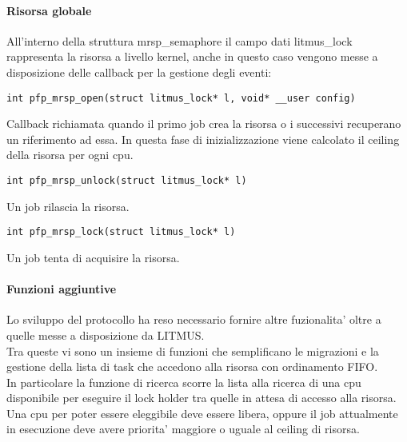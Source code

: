 \documentclass[a4paper,11pt]{article}
\begin{document}
\paragraph{Risorsa globale}

\noindent All'interno della struttura mrsp\_semaphore il campo dati litmus\_lock rappresenta la risorsa a livello kernel, anche in questo caso vengono messe a disposizione delle callback per la gestione degli eventi:

\hspace{0.2mm}
\begin{lstlisting}
int pfp_mrsp_open(struct litmus_lock* l, void* __user config)
\end{lstlisting}

\noindent Callback richiamata quando il primo job crea la risorsa o i successivi recuperano un riferimento ad essa. In questa fase di inizializzazione viene calcolato il ceiling della risorsa per ogni cpu.

\hspace{0.2mm}
\begin{lstlisting}
int pfp_mrsp_unlock(struct litmus_lock* l)
\end{lstlisting}

\noindent Un job rilascia la risorsa.

\hspace{0.2mm}
\begin{lstlisting}
int pfp_mrsp_lock(struct litmus_lock* l)
\end{lstlisting}

\noindent Un job tenta di acquisire la risorsa.

\hspace{0.2mm}
\paragraph{Funzioni aggiuntive}

\noindent Lo sviluppo del protocollo ha reso necessario fornire altre fuzionalita' oltre a quelle messe a disposizione da LITMUS.\\

\noindent Tra queste vi sono un insieme di funzioni che semplificano le migrazioni e la gestione della lista di task che accedono alla risorsa con ordinamento FIFO.\\

\noindent In particolare la funzione di ricerca scorre la lista alla ricerca di una cpu disponibile per eseguire il lock holder tra quelle in attesa di accesso alla risorsa. Una cpu per poter essere eleggibile deve essere libera, oppure il job attualmente in esecuzione deve avere priorita' maggiore o uguale al ceiling di risorsa.\\
\end{document}
